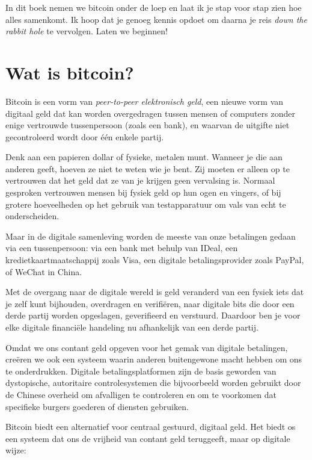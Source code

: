 \documentclass[
  letterpaper,
]{scrbook}
\begin{document}
In dit boek nemen we bitcoin onder de loep en laat ik je stap voor stap
zien hoe alles samenkomt. Ik hoop dat je genoeg kennis opdoet om daarna
je reis \emph{down the rabbit hole} te vervolgen. Laten we beginnen!


\hypertarget{wat-is-bitcoin}{%
\chapter{Wat is bitcoin?}\label{wat-is-bitcoin}}

Bitcoin is een vorm van \emph{peer-to-peer elektronisch geld}, een
nieuwe vorm van digitaal geld dat kan worden overgedragen tussen mensen
of computers zonder enige vertrouwde tussenpersoon (zoals een bank), en
waarvan de uitgifte niet gecontroleerd wordt door één enkele partij.

Denk aan een papieren dollar of fysieke, metalen munt. Wanneer je die
aan anderen geeft, hoeven ze niet te weten wie je bent. Zij moeten er
alleen op te vertrouwen dat het geld dat ze van je krijgen geen
vervalsing is. Normaal gesproken vertrouwen mensen bij fysiek geld op
hun ogen en vingers, of bij grotere hoeveelheden op het gebruik van
testapparatuur om vals van echt te onderscheiden.

Maar in de digitale samenleving worden de meeste van onze betalingen
gedaan via een tussenpersoon: via een bank met behulp van IDeal, een
kredietkaartmaatschappij zoals Visa, een digitale betalingsprovider
zoals PayPal, of WeChat in China.

Met de overgang naar de digitale wereld is geld veranderd van een fysiek
iets dat je zelf kunt bijhouden, overdragen en verifiëren, naar digitale
bits die door een derde partij worden opgeslagen, geverifieerd en
verstuurd. Daardoor ben je voor elke digitale financiële handeling nu
afhankelijk van een derde partij.

Omdat we ons contant geld opgeven voor het gemak van digitale
betalingen, creëren we ook een systeem waarin anderen buitengewone macht
hebben om ons te onderdrukken. Digitale betalingsplatformen zijn de
basis geworden van dystopische, autoritaire controlesystemen die
bijvoorbeeld worden gebruikt door de Chinese overheid om afvalligen te
controleren en om te voorkomen dat specifieke burgers goederen of
diensten gebruiken.

Bitcoin biedt een alternatief voor centraal gestuurd, digitaal geld. Het
biedt os een systeem dat ons de vrijheid van contant geld teruggeeft,
maar op digitale wijze:
\end{document}
